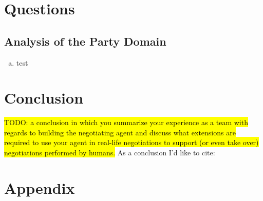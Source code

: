 \documentclass[a4paper,10pt]{article}
\newcommand{\todo}[1] {\hl{TODO: #1}}
\begin{document}
\section{Questions}
\label{sec:questions}

\subsection{Analysis of the Party Domain}

\begin{enumerate}[(a)]

\item{test}

\end{enumerate}

\section{Conclusion}
\label{sec:conclusion}
\todo{a conclusion in which you summarize your experience as a team with regards to building the negotiating agent and discuss what extensions are required to use your agent in real-life negotiations to support (or even take over) negotiations performed by humans.}
As a conclusion I'd like to cite: \cite{baarslag2012decoupling}

\newpage
\section*{Appendix}



\end{document}
